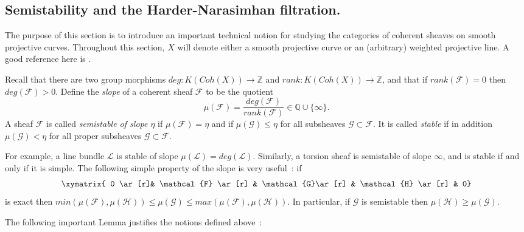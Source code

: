 \documentclass[a4paper,10pt]{amsart}
\def\Z{\mathbb{Z}}
\def\Q{\mathbb{Q}}
\numberwithin{equation}{section}
\begin{document}
{\newpage

\subsection{Semistability and the Harder-Narasimhan filtration.}

\vspace{.15in}

The purpose of this section is to introduce an important technical notion for studying the categories of coherent sheaves on smooth projective curves. Throughout this section, $X$ will denote either a smooth projective curve or an (arbitrary) weighted projective line. A good reference here is \cite{Seshadri}.

\vspace{.1in}

Recall that there are two group morphisms $deg: K(Coh(X)) \to \Z$ and $rank: K(Coh(X)) \to \Z$, and that if $rank(\mathcal{F})=0$ then $deg(\mathcal{F})>0$. Define the \textit{slope} of a coherent sheaf $\mathcal{F}$ to be the quotient
$$\mu(\mathcal{F})=\frac{deg(\mathcal{F})}{rank(\mathcal{F})} \in \Q \cup \{\infty\}.$$
A sheaf $\mathcal{F}$ is called \textit{semistable of slope $\eta$} if $\mu(\mathcal{F})=\eta$ and if $\mu(\mathcal{G}) \leq \eta$ for all subsheaves $\mathcal{G}\subset \mathcal{F}$. It is called \textit{stable} if in addition $\mu(\mathcal{G})<\eta$ for all proper subsheaves $\mathcal{G}\subset \mathcal{F}$.

For example, a line bundle $\mathcal{L}$ is stable of slope $\mu(\mathcal{L})=deg(\mathcal{L})$. Similarly, a torsion sheaf is semistable of slope $\infty$, and is stable if and only if it is simple.
The following simple property of the slope is very useful~: if
$$\xymatrix{ 0 \ar[r]& \mathcal{F} \ar[r] & \mathcal{G}\ar[r] & \mathcal{H} \ar[r] & 0}$$
is exact then $min(\mu(\mathcal{F}),\mu(\mathcal{H})) \leq \mu(\mathcal{G}) \leq max(\mu(\mathcal{F}),\mu(\mathcal{H}))$. In particular, if $\mathcal{G}$ is semistable then
$\mu(\mathcal{H}) \geq \mu(\mathcal{G})$.

\vspace{.15in}

The following important Lemma justifies the notions defined above~:

\vspace{.1in}

}
\end{document}
